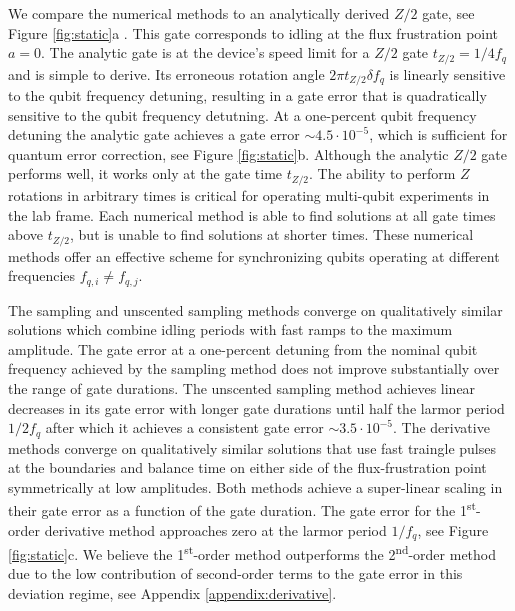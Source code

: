 We compare the numerical methods
to an analytically derived $Z/2$ gate, see Figure \ref{fig:static}a 
. 
This gate corresponds to
idling at the flux frustration point $a = 0$. The analytic gate
is at the device's speed limit for a $Z/2$ gate $t_{Z/2} = 1 / 4 f_{q}$ and
is simple to derive. Its erroneous rotation angle $2 \pi t_{Z/2} \delta f_{q}$ is linearly sensitive to
the qubit frequency detuning, resulting in a gate error that is quadratically sensitive
to the qubit frequency detutning.
At a one-percent
qubit frequency detuning the analytic gate achieves a gate error $\sim 4.5 \cdot 10^{-5}$,
which is sufficient for quantum error correction, see Figure \ref{fig:static}b.
Although the analytic $Z/2$ gate performs well, it works
only at the gate time $t_{Z/2}$. The ability to perform $Z$ rotations in arbitrary times is critical
for operating multi-qubit experiments in the lab frame.
Each numerical method is able to find solutions at
all gate times above $t_{Z/2}$, but is unable to find solutions at shorter times.
These numerical methods offer an effective scheme for synchronizing
qubits operating at different frequencies $f_{q, i} \neq f_{q, j}$.

The sampling and unscented sampling methods
converge on qualitatively similar solutions which combine idling periods
with fast ramps to the maximum amplitude. The gate error at a one-percent
detuning from the nominal qubit frequency achieved
by the sampling method does not improve substantially over the
range of gate durations. The unscented sampling method
achieves linear decreases in its gate error with longer gate durations
until half the larmor period $1 / 2 f_{q}$ after which it achieves a consistent
gate error $\sim 3.5 \cdot 10^{-5}$.
The derivative methods converge on qualitatively similar solutions that
use fast traingle pulses at the boundaries and balance time
on either side of the flux-frustration point symmetrically at low amplitudes.
Both methods achieve a super-linear scaling in their gate error as
a function of the gate duration. The gate error for the 1\textsuperscript{st}-order
derivative method approaches zero at the larmor period $1 / f_{q}$, see Figure \ref{fig:static}c.
We believe the 1\textsuperscript{st}-order method outperforms the 2\textsuperscript{nd}-order
method due to the low contribution of second-order
terms to the gate error in this deviation regime, see Appendix \ref{appendix:derivative}.

